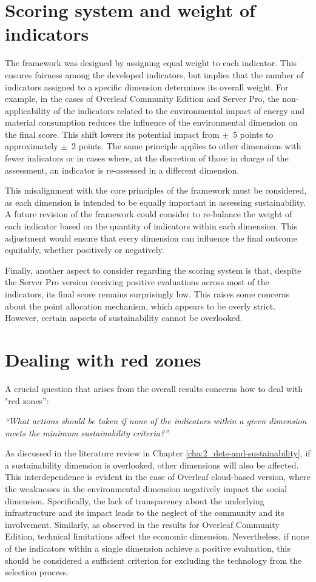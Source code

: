 \section{Scoring system and weight of indicators}
The framework was designed by assigning equal weight to each indicator. This ensures fairness among the developed indicators, but implies that the number of indicators assigned to a specific dimension determines its overall weight. For example, in the cases of Overleaf Community Edition and Server Pro, the non-applicability of the indicators related to the environmental impact of energy and material consumption reduces the influence of the environmental dimension on the final score. This shift lowers its potential impact from \(\pm\)\ 5 points to approximately \(\pm\)\ 2 points. The same principle applies to other dimensions with fewer indicators or in cases where, at the discretion of those in charge of the assessment, an indicator is re-assessed in a different dimension.

This misalignment with the core principles of the framework must be considered, as each dimension is intended to be equally important in assessing sustainability. A future revision of the framework could consider to re-balance the weight of each indicator based on the quantity of indicators within each dimension. This adjustment would ensure that every dimension can influence the final outcome equitably, whether positively or negatively.

Finally, another aspect to consider regarding the scoring system is that, despite the Server Pro version receiving positive evaluations across most of the indicators, its final score remains surprisingly low. This raises some concerns about the point allocation mechanism, which appears to be overly strict. However, certain aspects of sustainability cannot be overlooked.

\section{Dealing with red zones}
A crucial question that arises from the overall results concerns how to deal with "red zones”:
\begin{center}
    \textit{“What actions should be taken if none of the indicators within a given dimension meets the minimum sustainability criteria?”}
\end{center}

As discussed in the literature review in Chapter \ref{cha:2_dets-and-sustainability}, if a sustainability dimension is overlooked, other dimensions will also be affected. This interdependence is evident in the case of Overleaf cloud-based version, where the weaknesses in the environmental dimension negatively impact the social dimension. Specifically, the lack of transparency about the underlying infrastructure and its impact leads to the neglect of the community and its involvement. Similarly, as observed in the results for Overleaf Community Edition, technical limitations affect the economic dimension. Nevertheless, if none of the indicators within a single dimension achieve a positive evaluation, this should be considered a sufficient criterion for excluding the technology from the selection process.

